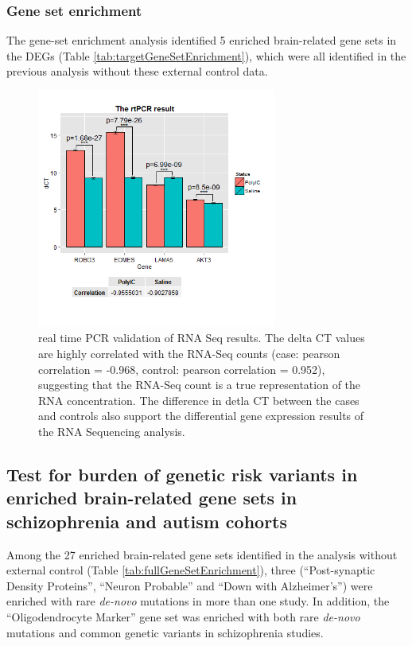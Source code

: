 \subsubsection{Gene set enrichment}
The gene-set enrichment analysis identified 5 enriched brain-related gene sets in the DEGs (Table \ref{tab:targetGeneSetEnrichment}), which were all identified in the previous analysis without these external control data. 





\begin{figure}
	\caption{real time PCR validation of RNA Seq results.
		The delta CT values are highly correlated with the RNA-Seq counts (case: pearson correlation = -0.968, control: pearson correlation = 0.952), suggesting that the RNA-Seq count is a true representation of the RNA concentration.
		The difference in detla CT between the cases and controls also support the differential gene expression results of the RNA Sequencing analysis.}\label{fig:rtResult}
		\vspace{-20pt}
	\begin{center}
		\includegraphics[trim=0cm 2cm 0cm 1cm, clip=true, width=0.7\textwidth]{environmental_risk/image/er_rtPCR.png}
	\end{center}
\end{figure}

\subsection{Test for burden of genetic risk variants in enriched brain-related gene sets in schizophrenia and autism cohorts }
Among the 27 enriched brain-related gene sets identified in the analysis without external control (Table \ref{tab:fullGeneSetEnrichment}), three (``Post-synaptic Density Proteins'', ``Neuron Probable'' and ``Down with Alzheimer's'') were enriched with rare \textit{de-novo} mutations in more than one study. 
In addition, the ``Oligodendrocyte Marker'' gene set was enriched with both rare \textit{de-novo} mutations and common genetic variants in schizophrenia studies. 


